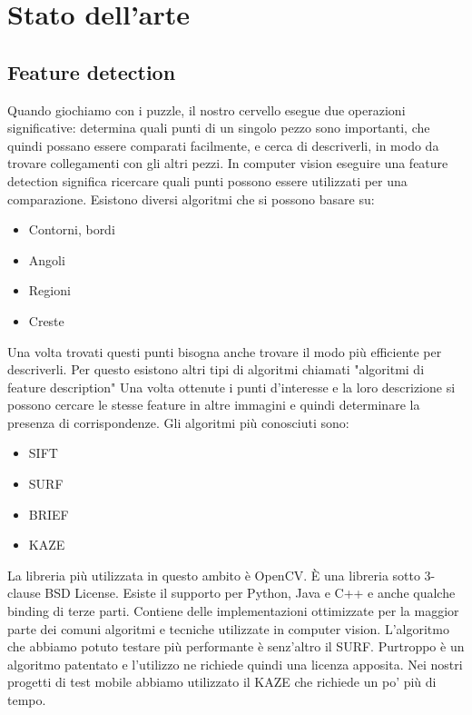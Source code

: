 \documentclass[twoside]{supsistudent}
\begin{document}
\section{Stato dell'arte} %
\subsection{Feature detection}%
Quando giochiamo con i puzzle, il nostro cervello esegue due operazioni significative: determina quali punti di un singolo pezzo sono importanti, che quindi possano essere comparati facilmente, e cerca di descriverli, in modo da trovare collegamenti con gli altri pezzi. In computer vision eseguire una feature detection significa ricercare quali punti possono essere utilizzati per una comparazione. Esistono diversi algoritmi che si possono basare su: \begin{itemize}
\item Contorni, bordi
\item Angoli
\item Regioni
\item Creste
\end{itemize}
Una volta trovati questi punti bisogna anche trovare il modo più efficiente per descriverli. Per questo esistono altri tipi di algoritmi chiamati "algoritmi di feature description"
Una volta ottenute i punti d'interesse e la loro descrizione si possono cercare le stesse feature in altre immagini e quindi determinare la presenza di corrispondenze. 
Gli algoritmi più conosciuti sono:
\begin{itemize}
\item SIFT
\item SURF
\item BRIEF
\item KAZE
\end{itemize}
La libreria più utilizzata in questo ambito è OpenCV. È una libreria sotto 3-clause BSD License. Esiste il supporto per Python, Java e C++ e anche qualche binding di terze parti. Contiene delle implementazioni ottimizzate per la maggior parte dei comuni algoritmi e tecniche utilizzate in computer vision.
L'algoritmo che abbiamo potuto testare più performante è senz'altro il SURF. Purtroppo è un algoritmo patentato e l'utilizzo ne richiede quindi una licenza apposita. Nei nostri progetti di test mobile abbiamo utilizzato il KAZE che richiede un po' più di tempo.
\end{document}
